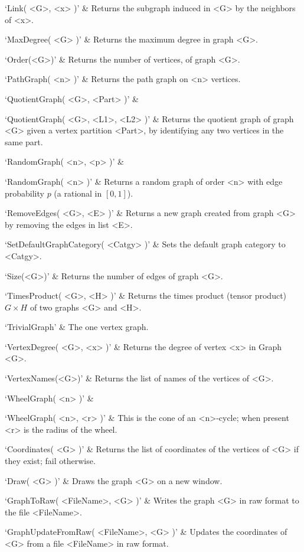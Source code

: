 `Link( <G>, <x> )' & 
Returns the subgraph induced in <G> by the neighbors of <x>.

`MaxDegree( <G> )' & 
Returns the maximum degree in graph <G>.

`Order(<G>)' & 
Returns the number of vertices, of graph <G>.

`PathGraph( <n> )' & 
Returns the path graph on <n> vertices.

`QuotientGraph( <G>, <Part> )' & 

`QuotientGraph( <G>, <L1>, <L2> )' & 
Returns the quotient graph of graph <G> given a vertex partition <Part>, by identifying any two vertices in the same part.

`RandomGraph( <n>, <p> )' & 

`RandomGraph( <n> )' & 
Returns a random graph of order <n> with edge probability $p$ (a rational in $[0,1]$).

`RemoveEdges( <G>, <E> )' & 
Returns  a  new graph created from graph <G> by removing the edges in list <E>.

`SetDefaultGraphCategory( <Catgy> )' & 
Sets  the default graph category to <Catgy>.

`Size(<G>)' & 
Returns the number of edges of graph <G>.

`TimesProduct( <G>, <H> )' & 
Returns  the  times  product (tensor product) $G  \times  H$ of two graphs <G> and <H>.

`TrivialGraph' & 
The one vertex graph.

`VertexDegree( <G>, <x> )' & 
Returns the degree of vertex <x> in Graph <G>.

`VertexNames(<G>)' & 
Returns  the  list of names of the vertices of <G>.

`WheelGraph( <n> )' & 

`WheelGraph( <n>, <r> )' & 
This  is  the   cone  of  an  <n>-cycle; when present <r> is the radius of the wheel.
\enditems


\beginitems
`Coordinates( <G> )' & 
Returns the list of coordinates of the vertices of <G> if they exist; fail otherwise.

`Draw( <G> )' &
Draws the graph <G> on a new window.

`GraphToRaw( <FileName>, <G> )' &
Writes the graph <G> in raw format to the file  <FileName>.

`GraphUpdateFromRaw( <FileName>, <G> )' &
Updates  the  coordinates  of  <G>  from  a file <FileName> in raw format.

